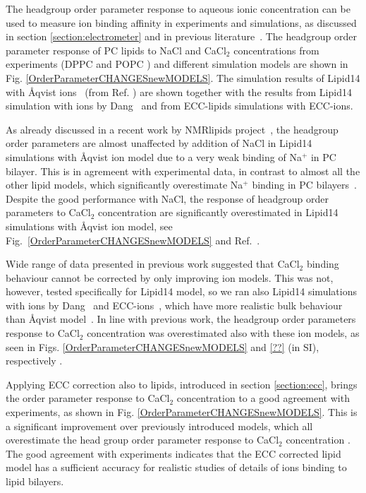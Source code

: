 \documentclass[aip,jcp,twocolumn]{revtex4}
\begin{document}
The headgroup order parameter response to aqueous ionic concentration
can be used to measure ion binding affinity in experiments and simulations,
as discussed in section \ref{section:electrometer} and in previous literature~\cite{seelig87,catte16}.
The headgroup order parameter response of PC lipids to NaCl and CaCl$_2$ concentrations
from experiments (DPPC \cite{akutsu81} and POPC \cite{altenbach84}) and different simulation
models are shown in Fig. \ref{OrderParameterCHANGESnewMODELS}.
The simulation results of Lipid14 with \AA{}qvist ions~\cite{aqvist90} (from Ref. )
are shown together with the results from Lipid14 simulation
with ions by Dang~\cite{smith94,chang1999,dang2006} and from ECC-lipids simulations with ECC-ions.

As already discussed in a recent work by NMRlipids project~\cite{catte16},
the headgroup order parameters are almost unaffected by addition of NaCl
in Lipid14 simulations with \AA{}qvist ion model due to a very weak binding of Na$^+$
in PC bilayer. This is in agremeent with experimental data, in contrast
to almost all the other lipid models, which significantly overestimate
Na$^+$ binding in PC bilayers~\cite{catte16}. Despite the good performance
with NaCl, the response of headgroup order parameters to CaCl$_2$ concentration are
significantly overestimated in Lipid14 simulations with \AA{}qvist ion model,
see Fig.~\ref{OrderParameterCHANGESnewMODELS} and Ref.~.

Wide range of data presented in previous work \cite{catte16} suggested
that CaCl$_2$ binding behaviour cannot be corrected by only improving
ion models. This was not, however, tested specifically for Lipid14 model, so we
ran also Lipid14 simulations with ions by Dang~\cite{smith94,chang1999,dang2006} 
and ECC-ions~\cite{jungwirth17-new-paper-to-be-published, kohagen16, Pluharova2014},
which have more realistic bulk behaviour than \AA{}qvist model~\cite{aqvist90}.
In line with previous work, the headgroup order parameters response
to CaCl$_2$ concentration was overestimated also with these ion models,
as seen in Figs. \ref{OrderParameterCHANGESnewMODELS} and \ref{??} (in SI), respectively
.

Applying ECC correction also to lipids, introduced in section \ref{section:ecc},
brings the order parameter response to CaCl$_2$ concentration to a
good agreement with experiments, as shown in Fig. \ref{OrderParameterCHANGESnewMODELS}.
This is a significant improvement over previously introduced models,
which all overestimate the head group order parameter response to CaCl$_2$
concentration \cite{catte16}. The good agreement with experiments indicates
that the ECC corrected lipid model has a sufficient accuracy for realistic
studies of details of ions binding to lipid bilayers.
\end{document}
